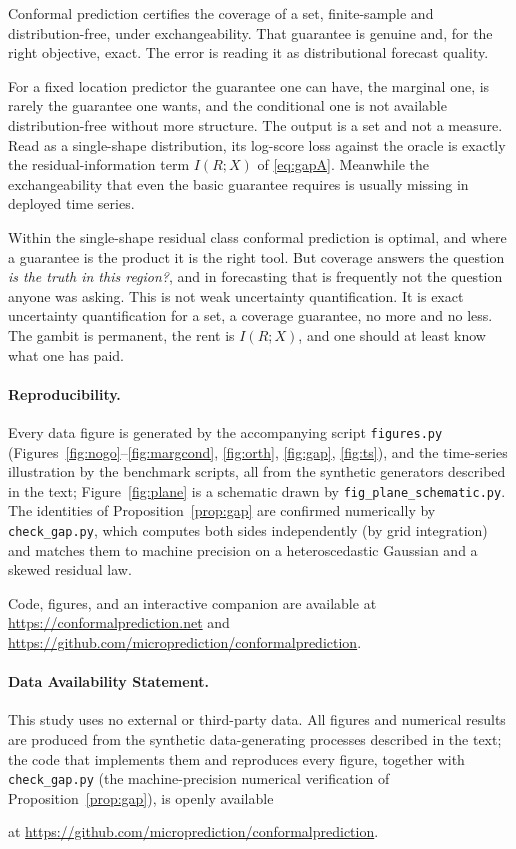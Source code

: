 \documentclass[11pt]{article}
\newif\ifanon\anonfalse
\theoremstyle{definition}
\begin{document}
Conformal prediction certifies the coverage of a set, finite-sample and distribution-free,
under exchangeability. That guarantee is genuine and, for the right objective, exact. The
error is reading it as distributional forecast quality.

For a fixed location predictor the guarantee one can have, the marginal one, is rarely the
guarantee one wants, and the conditional one is not available distribution-free without more
structure. The output is a set and not a measure. Read as a single-shape distribution, its
log-score loss against the oracle is exactly the residual-information term $I(R;X)$ of
\eqref{eq:gapA}. Meanwhile the exchangeability that even the basic guarantee requires is
usually missing in deployed time series.

Within the single-shape residual class conformal prediction is optimal, and where a
guarantee is the product it is the right tool. But coverage answers the question \emph{is
the truth in this region?}, and in forecasting that is frequently not the question anyone
was asking. This is not weak uncertainty quantification. It is exact uncertainty
quantification for a set, a coverage guarantee, no more and no less. The gambit is
permanent, the rent is $I(R;X)$, and one should at least know what one has paid.

\paragraph{Reproducibility.} Every data figure is generated by the accompanying script
\texttt{figures.py} (Figures~\ref{fig:nogo}--\ref{fig:margcond}, \ref{fig:orth},
\ref{fig:gap}, \ref{fig:ts}), and the time-series illustration by the benchmark scripts, all
from the synthetic generators described in the text; Figure~\ref{fig:plane} is a schematic
drawn by \texttt{fig\_plane\_schematic.py}. The
identities of Proposition~\ref{prop:gap} are confirmed numerically by \texttt{check\_gap.py},
which computes both sides independently (by grid integration) and matches them to machine
precision on a heteroscedastic Gaussian and a skewed residual law.
\ifanon
Code, figures, and an interactive companion are provided as supplementary material; public
URLs are omitted for anonymous review.
\else
Code, figures, and an interactive companion are available at
\url{https://conformalprediction.net} and
\url{https://github.com/microprediction/conformalprediction}.
\fi

\paragraph{Data Availability Statement.} This study uses no external or third-party data.
All figures and numerical results are produced from the synthetic data-generating processes
described in the text; the code that implements them and reproduces every figure, together
with \texttt{check\_gap.py} (the machine-precision numerical verification of
Proposition~\ref{prop:gap}), is openly available
\ifanon
as supplementary material accompanying this submission (the public repository URL is omitted
for anonymous review).
\else
at \url{https://github.com/microprediction/conformalprediction}.
\fi
\end{document}
